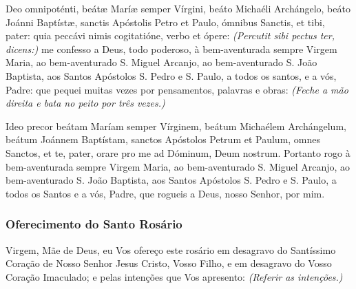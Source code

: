 \begin{paracol}{2}
 Deo omnipoténti, beátæ Maríæ semper Vírgini, beáto Michaéli Archángelo, beáto Joánni Baptístæ, sanctis Apóstolis Petro et Paulo, ómnibus Sanctis, et tibi, pater: quia peccávi nimis cogitatióne, verbo et ópere: \emph{(Percutit sibi pectus ter, dicens:)}
\switchcolumn
{} me confesso a Deus, todo poderoso, à bem-aventurada sempre Virgem Maria, ao bem-aventurado S. Miguel Arcanjo, ao bem-aventurado S. João Baptista, aos Santos Apóstolos S. Pedro e S. Paulo, a todos os santos, e a vós, Padre: que pequei muitas vezes por pensamentos, palavras e obras: \emph{(Feche a mão direita e bata no peito por três vezes.)}
\switchcolumn*
\begin{nscenter}\emph{}\end{nscenter}
\switchcolumn
\begin{nscenter}\emph{}\end{nscenter}
\switchcolumn*
Ideo precor beátam Maríam semper Vírginem, beátum Michaélem Archángelum, beátum Joánnem Baptístam, sanctos Apóstolos Petrum et Paulum, omnes Sanctos, et te, pater, orare pro me ad Dóminum, Deum nostrum.
\switchcolumn
Portanto rogo à bem-aventurada sempre Virgem Maria, ao bem-aventurado S. Miguel Arcanjo, ao bem-aventurado S. João Baptista, aos Santos Apóstolos S. Pedro e S. Paulo, a todos os Santos e a vós, Padre, que rogueis a Deus, nosso Senhor, por mim.
\end{paracol}

\subsubsection{Oferecimento do Santo Rosário}

 Virgem, Mãe de Deus, eu Vos ofereço este rosário em desagravo do Santíssimo Coração de Nosso Senhor Jesus Cristo, Vosso Filho, e em desagravo do Vosso Coração Imaculado; e pelas intenções que Vos apresento: \emph{(Referir as intenções.)}

\emph{}


